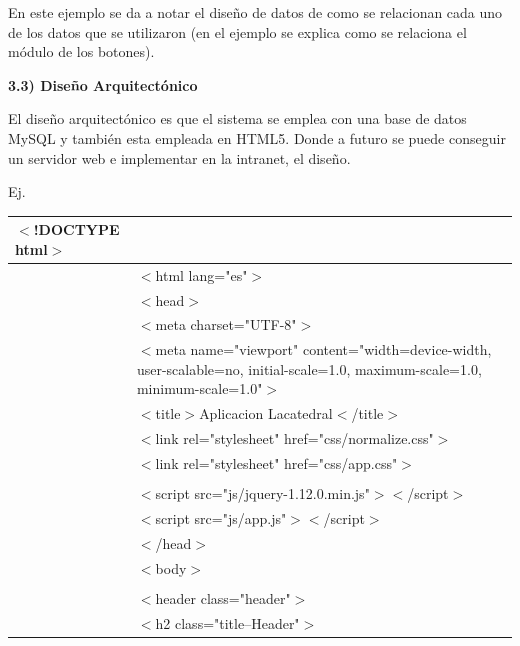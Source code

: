 \documentclass{article} %
\begin{document}
\noindent 

\noindent En este ejemplo se da a notar el dise\~{n}o de datos de como se relacionan cada uno de los datos que se utilizaron (en el ejemplo se explica como se relaciona el m\'{o}dulo de los botones).

\noindent 

\noindent \textbf{3.3) Dise\~{n}o Arquitect\'{o}nico}

\noindent El dise\~{n}o arquitect\'{o}nico es que el sistema se emplea con una base de datos MySQL y tambi\'{e}n esta empleada en HTML5. Donde a futuro se puede conseguir un servidor web e implementar en la intranet, el dise\~{n}o.

\noindent Ej.

\begin{tabular}{|p{0.6in}|p{4.0in}|} \hline 
$\mathrm{<}$!DOCTYPE html$\mathrm{>}$ \\ \hline 
 & $\mathrm{<}$html lang="es"$\mathrm{>}$ \\ \hline 
 & $\mathrm{<}$head$\mathrm{>}$ \\ \hline 
 &  $\mathrm{<}$meta charset="UTF-8"$\mathrm{>}$ \\ \hline 
 &  $\mathrm{<}$meta name="viewport" content="width=device-width, user-scalable=no, initial-scale=1.0, maximum-scale=1.0, minimum-scale=1.0"$\mathrm{>}$ \\ \hline 
 &  $\mathrm{<}$title$\mathrm{>}$Aplicacion Lacatedral$\mathrm{<}$/title$\mathrm{>}$ \\ \hline 
 &  $\mathrm{<}$link rel="stylesheet" href="css/normalize.css"$\mathrm{>}$ \\ \hline 
 &  $\mathrm{<}$link rel="stylesheet" href="css/app.css"$\mathrm{>}$ \\ \hline 
 & \newline  \\ \hline 
 &  $\mathrm{<}$script src="js/jquery-1.12.0.min.js"$\mathrm{>}$$\mathrm{<}$/script$\mathrm{>}$ \\ \hline 
 &  $\mathrm{<}$script src="js/app.js"$\mathrm{>}$$\mathrm{<}$/script$\mathrm{>}$ \\ \hline 
 & $\mathrm{<}$/head$\mathrm{>}$ \\ \hline 
 & $\mathrm{<}$body$\mathrm{>}$ \\ \hline 
 & \newline  \\ \hline 
 &  $\mathrm{<}$header class="header"$\mathrm{>}$ \\ \hline 
 &   $\mathrm{<}$h2 class="title--Header"$\mathrm{>}$ \\ \hline 

\end{tabular}
\end{document}
